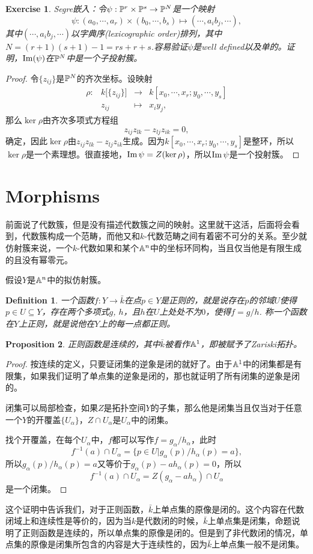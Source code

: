 \documentclass[9pt]{extbook}
\theoremstyle{plain}%
\newtheorem{defi}{Definition}[section]%
\newtheorem{pro}[defi]{Proposition}%
\newtheorem{exe}{Exercise}[section]%
\begin{document}
\setcounter{exe}{13}
\begin{exe}
	Segre嵌入：令$\psi:\mathbb{P}^r\times \mathbb{P}^s\to \mathbb{P}^N$是一个映射
	\[
		\psi:(a_0,\cdots,a_r)\times (b_0,\cdots,b_s)\mapsto (\cdots,a_ib_j,\cdots),
	\]
	其中$(\cdots,a_ib_j,\cdots)$以字典序(lexicographic order)排列，其中$N=(r+1)(s+1)-1=rs+r+s$.容易验证$\psi$是well defined以及单的。证明，$\operatorname{Im}(\psi)$在$\mathbb{P}^N$中是一个子投射簇。
\end{exe}
\begin{proof}
	令$\{z_{ij}\}$是$\mathbb{P}^N$的齐次坐标。设映射
	\[
	\begin{array}{lccl}
		\rho:&k\bigl[\{z_{ij}\}\bigr]&\to&k[x_0,\cdots,x_r;y_0,\cdots,y_s]\\
		&z_{ij}&\mapsto&x_iy_j,
	\end{array}
	\]
	那么$\ker \rho$由齐次多项式方程组
	\[
		z_{ij}z_{lk}-z_{lj}z_{ik}=0,
	\]
	确定，因此$\ker \rho$由$z_{ij}z_{lk}-z_{lj}z_{ik}$生成。因为$k[x_0,\cdots,x_r;y_0,\cdots,y_s]$是整环，所以$\ker \rho$是一个素理想。很直接地，$\operatorname{Im} \psi=Z(\ker \rho)$，所以$\operatorname{Im} \psi$是一个投射簇。
\end{proof}
\section{Morphisms}
前面说了代数簇，但是没有描述代数簇之间的映射。这里就干这活，后面将会看到，代数簇构成一个范畴，而他又和$k$-代数范畴之间有着密不可分的关系。至少就仿射簇来说，一个$k$-代数如果和某个$\mathbb{A}^n$中的坐标环同构，当且仅当他是有限生成的且没有幂零元。

假设$Y$是$\mathbb{A}^n$中的拟仿射簇。
\begin{defi}
	一个函数$f:Y\to \bar{k}$在点$p\in Y$是正则的，就是说存在$p$的邻域$U$使得$p\in U\subseteq Y$，存在两个多项式$g$, $h$，且$h$在$U$上处处不为$0$，使得$f=g/h$. 称一个函数在$Y$上正则，就是说他在$Y$上的每一点都正则。
\end{defi}
\begin{pro}
正则函数是连续的，其中$\bar{k}$被看作$\mathbb{A}^1$，即被赋予了Zariski拓扑。
\end{pro}
\begin{proof}
	按连续的定义，只要证闭集的逆象是闭的就好了。由于$\mathbb{A}^1$中的闭集都是有限集，如果我们证明了单点集的逆象是闭的，那也就证明了所有闭集的逆象是闭的。

	闭集可以局部检查，如果$Z$是拓扑空间$Y$的子集，那么他是闭集当且仅当对于任意一个$Y$的开覆盖$\{U_\alpha\}$，$Z\cap U_\alpha$是$U_\alpha$中的闭集。

	找个开覆盖，在每个$U_\alpha$中，$f$都可以写作$f=g_\alpha/h_\alpha$，此时
	\[
		f^{-1}(a)\cap U_\alpha=\bigl\{p\in U| g_\alpha(p)/h_\alpha(p)=a\bigr\},
	\]
	所以$g_\alpha(p)/h_\alpha(p)=a$又等价于$g_\alpha(p)-ah_\alpha(p)=0$，所以
	\[
		f^{-1}(a)\cap U_\alpha=Z(g_\alpha-ah_\alpha)\cap U_\alpha
	\]
	是一个闭集。
\end{proof}
这个证明中告诉我们，对于正则函数，$\bar{k}$上单点集的原像是闭的。这个内容在代数闭域上和连续性是等价的，因为当$k$是代数闭的时候，$\bar{k}$上单点集是闭集，命题说明了正则函数是连续的，所以单点集的原像是闭的。但是到了非代数闭的情况，单点集的原像是闭集所包含的内容是大于连续性的，因为$\bar{k}$上单点集一般不是闭集。
\end{document}
